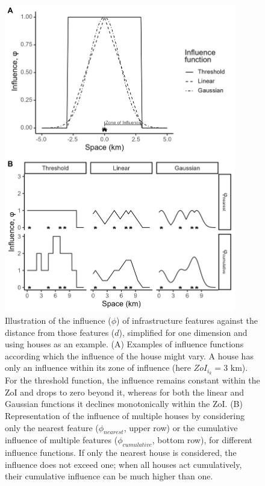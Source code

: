 \documentclass[titlepage]{article}
\begin{document}
\begin{figure}[h]
\centering
\includegraphics[width=0.9\textwidth]{figures/ZoI_conceptual.png}
\caption{\label{fig:zoi_conceptual} Illustration of the influence ($\phi$) of infrastructure features against the distance from those features ($d$), simplified for one dimension and using houses as an example. (A) Examples of influence functions according which the influence of the house might vary. A house has only an influence within its zone of influence (here $ZoI_{i_k} = 3 \text{ km}$). For the threshold function, the influence remains constant within the ZoI and drops to zero beyond it, whereas for both the linear and Gaussian functions it declines monotonically within the ZoI. 
(B) Representation of the influence of multiple houses by considering only the nearest feature ($\phi_{nearest}$, upper row) or the cumulative influence of multiple features ($\phi_{cumulative}$, bottom row), for different influence functions. If only the nearest house is considered, the influence does not exceed one; when all houses act cumulatively, their cumulative influence can be much higher than one.}
\end{figure}
\end{document}
